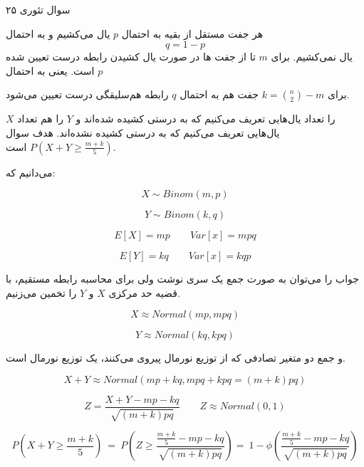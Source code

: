 سوال تئوری ۲۵

هر جفت مستقل از بقیه به احتمال
$p$
یال می‌کشیم و به احتمال 
$$
q=1-p
$$
یال نمی‌کشیم.
برای 
$m$
تا از جفت ها در صورت یال کشیدن رابطه درست تعیین شده است.
یعنی به احتمال 
$p$


برای 
$k=\binom{n}{2}-m$
جفت هم به احتمال 
$q$
رابطه هم‌سلیقگی درست تعیین می‌شود.

$X$
را تعداد یال‌هایی تعریف می‌کنیم که به درستی کشیده شده‌اند و 
$Y$
را هم تعداد یال‌هایی تعریف می‌کنیم که به درستی کشیده نشده‌اند.
هدف سوال
$P(X+Y \ge \frac{m+k}{5})$
است.


می‌دانیم که:

$$X \sim Binom(m, p)$$

$$Y \sim Binom(k, q)$$

$$E[X]=mp \qquad Var[x]=mpq$$

$$E[Y]=kq \qquad Var[x]=kqp$$

جواب را می‌توان به صورت جمع یک سری نوشت ولی برای محاسبه رابطه مستقیم،
با قضیه حد مرکزی 
$X$
و
$Y$
را تخمین می‌زنیم.

$$X \approx Normal(mp, mpq)$$

$$Y \approx Normal(kq, kpq)$$

و جمع دو متغیر تصادفی که از توزیع نورمال پیروی می‌کنند، یک توزیع نورمال است.

$$X+Y \approx Normal(mp+kq, mpq+kpq = (m+k)pq )$$

$$Z=\frac{X+Y-mp-kq}{\sqrt{(m+k)pq}} \qquad Z \approx Normal(0, 1)$$

$$P(X+Y \ge \frac{m+k}{5}) \ = \ P(Z \ge \frac{\frac{m+k}{5}-mp-kq}{\sqrt{(m+k)pq}}) 
    = \ 1-\phi(\frac{\frac{m+k}{5}-mp-kq}{\sqrt{(m+k)pq}})$$